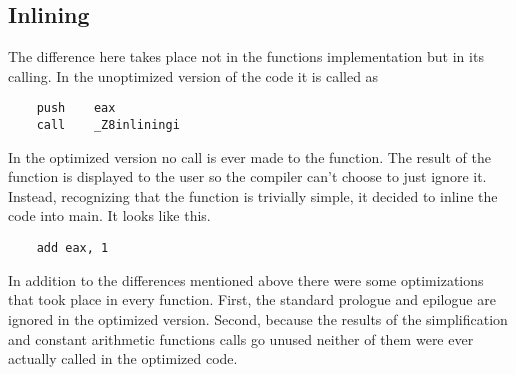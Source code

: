 \documentclass{article}
\begin{document}
\subsection{Inlining}
The difference here takes place not in the functions implementation but in its calling. In the unoptimized version of the code it is called as
\begin{lstlisting}
	push	eax
	call	_Z8inliningi
\end{lstlisting}
In the optimized version no call is ever made to the function. The result of the function is displayed to the user so the compiler can't choose to just ignore it. Instead, recognizing that the function is trivially simple, it decided to inline the code into main. It looks like this.
\begin{lstlisting}
	add	eax, 1
\end{lstlisting}

In addition to the differences mentioned above there were some optimizations that took place in every function. First, the standard prologue and epilogue are ignored in the optimized version. Second, because the results of the simplification and constant arithmetic functions calls go unused neither of them were ever actually called in the optimized code. 
\end{document}
